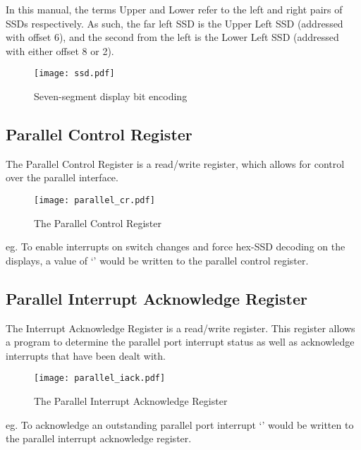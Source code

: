 In this manual, the terms Upper and Lower refer to the left and right
pairs of SSDs respectively. As such, the far left SSD is the Upper Left
SSD (addressed with offset 6), and the second from the left is the Lower
Left SSD (addressed with either offset 8 or 2).

\begin{figure}[h]
\begin{center}
\texttt{[image: ssd.pdf]}
\caption{Seven-segment display bit encoding}
\label{fig:ssd}
\end{center}
\end{figure}

\subsection{Parallel Control Register}

The Parallel Control Register is a read/write register, which allows
for control over the parallel interface.

\begin{figure}[h]
\begin{center}
\texttt{[image: parallel\_cr.pdf]}
\caption{The Parallel Control Register}
\label{parallel_cr_pic}
\end{center}
\end{figure}

eg. To enable interrupts on switch changes and force hex-SSD decoding
on the displays, a value of `' would be written to
the parallel control register.

\subsection{Parallel Interrupt Acknowledge Register}

The Interrupt Acknowledge Register is a read/write register. This
register allows a program to determine the parallel port interrupt
status as well as acknowledge interrupts that have been dealt with.

\begin{figure}[h]
\begin{center}
\texttt{[image: parallel\_iack.pdf]}
\caption{The Parallel Interrupt Acknowledge Register}
\label{parallel_iack_pic}
\end{center}
\end{figure}

eg. To acknowledge an outstanding parallel port interrupt `'
would be written to the parallel interrupt acknowledge register.


